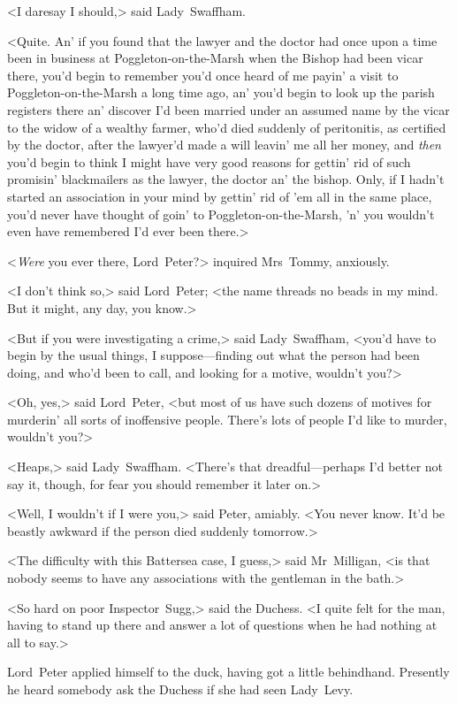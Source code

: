 <I daresay I should,> said Lady~Swaffham.

<Quite. An' if you found that the lawyer and the doctor had once upon a time been in business at Poggleton-on-the-Marsh when the Bishop had been vicar there, you'd begin to remember you'd once heard of me payin' a visit to Poggleton-on-the-Marsh a long time ago, an' you'd begin to look up the parish registers there an' discover I'd been married under an assumed name by the vicar to the widow of a wealthy farmer, who'd died suddenly of peritonitis, as certified by the doctor, after the lawyer'd made a will leavin' me all her money, and \textit{then} you'd begin to think I might have very good reasons for gettin' rid of such promisin' blackmailers as the lawyer, the doctor an' the bishop. Only, if I hadn't started an association in your mind by gettin' rid of 'em all in the same place, you'd never have thought of goin' to Poggleton-on-the-Marsh, 'n' you wouldn't even have remembered I'd ever been there.>

<\textit{Were} you ever there, Lord~Peter?> inquired Mrs~Tommy, anxiously.

<I don't think so,> said Lord~Peter; <the name threads no beads in my mind. But it might, any day, you know.>

<But if you were investigating a crime,> said Lady~Swaffham, <you'd have to begin by the usual things, I suppose—finding out what the person had been doing, and who'd been to call, and looking for a motive, wouldn't you?>

<Oh, yes,> said Lord~Peter, <but most of us have such dozens of motives for murderin' all sorts of inoffensive people. There's lots of people I'd like to murder, wouldn't you?>

<Heaps,> said Lady~Swaffham. <There's that dreadful—perhaps I'd better not say it, though, for fear you should remember it later on.>

<Well, I wouldn't if I were you,> said Peter, amiably. <You never know. It'd be beastly awkward if the person died suddenly tomorrow.>

<The difficulty with this Battersea case, I guess,> said Mr~Milligan, <is that nobody seems to have any associations with the gentleman in the bath.>

<So hard on poor Inspector~Sugg,> said the Duchess. <I quite felt for the man, having to stand up there and answer a lot of questions when he had nothing at all to say.>

Lord~Peter applied himself to the duck, having got a little behindhand. Presently he heard somebody ask the Duchess if she had seen Lady~Levy.

